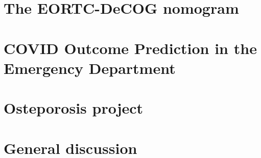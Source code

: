 \documentclass[
]{book}
\begin{document}
\vspace*{\fill}\par
\pagebreak

\hypertarget{the-eortc-decog-nomogram}{%
\chapter{The EORTC-DeCOG nomogram}\label{the-eortc-decog-nomogram}}

\vspace*{\fill}\par
\pagebreak

\lipsum[1-4]

\hypertarget{covid-outcome-prediction-in-the-emergency-department}{%
\chapter{COVID Outcome Prediction in the Emergency Department}\label{covid-outcome-prediction-in-the-emergency-department}}

\vspace*{\fill}\par
\pagebreak

\lipsum[1-4]

\hypertarget{osteporosis-project}{%
\chapter{Osteporosis project}\label{osteporosis-project}}

\hypertarget{general-discussion}{%
\chapter{General discussion}\label{general-discussion}}
\end{document}
